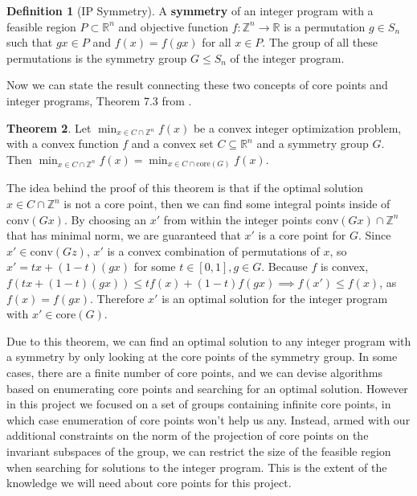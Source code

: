 \documentclass[11pt]{article} %
\theoremstyle{definition}
\newtheorem{theorem}{Theorem}[section]
\newtheorem{definition}[theorem]{Definition}
\theoremstyle{remark}
\newcommand{\ZZ}{\mathbb{Z}}
\newcommand{\RR}{\mathbb{R}}
\begin{document}
\begin{definition}[IP Symmetry]
A \textbf{symmetry} of an integer program with a feasible region $P \subset \RR^n$ and objective function $f : \ZZ^n \rightarrow \RR$ is a permutation $g \in S_n$ such that $gx \in P$ and $f(x) = f(gx)$ for all $x \in P$. The group of all these permutations is the symmetry group $G \leq S_n$ of the integer program.
\end{definition}

Now we can state the result connecting these two concepts of core points and integer programs, Theorem 7.3 from \cite{rehn}.

\begin{theorem}
Let $\min_{x \in C \cap \ZZ^n} f(x)$ be a convex integer optimization problem, with a convex function $f$ and a convex set $C \subseteq \mathbb{R}^n$ and a symmetry group $G$. Then $\min_{x \in C \cap \ZZ^n} f(x) = \min_{x \in C \cap \textrm{core}(G)} f(x)$.
\end{theorem}

The idea behind the proof of this theorem is that if the optimal solution $x \in C \cap \ZZ^n$ is not a core point, then we can find some integral points inside of $\textrm{conv}(Gx)$. By choosing an $x'$ from within the integer points $\textrm{conv}(Gx) \cap \ZZ^n$ that has minimal norm, we are guaranteed that $x'$ is a core point for $G$. Since $x' \in \textrm{conv}(Gz)$, $x'$ is a convex combination of permutations of $x$, so $x' = tx + (1-t)(gx)$ for some $t \in [0,1], g \in G$. Because $f$ is convex, $f(tx + (1-t)(gx)) \leq tf(x) + (1-t)f(gx) \implies f(x') \leq f(x)$, as $f(x) = f(gx)$. Therefore $x'$ is an optimal solution for the integer program with $x' \in \textrm{core}(G)$.

Due to this theorem, we can find an optimal solution to any integer program with a symmetry by only looking at the core points of the symmetry group. In some cases, there are a finite number of core points, and we can devise algorithms based on enumerating core points and searching for an optimal solution. However in this project we focused on a set of groups containing infinite core points, in which case enumeration of core points won't help us any. Instead, armed with our additional constraints on the norm of the projection of core points on the invariant subspaces of the group, we can restrict the size of the feasible region when searching for solutions to the integer program. This is the extent of the knowledge we will need about core points for this project.
\end{document}
